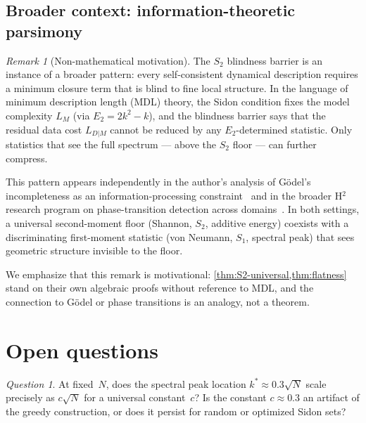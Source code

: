 \documentclass[11pt]{article}
\theoremstyle{definition}
\theoremstyle{remark}
\newtheorem{remark}[theorem]{Remark}
\newtheorem{question}[theorem]{Question}
\begin{document}
\subsection{Broader context: information-theoretic parsimony}

\begin{remark}[Non-mathematical motivation]
The $S_2$ blindness barrier is an instance of a broader
pattern: every self-consistent dynamical description
requires a minimum closure term that is blind to fine local
structure.  In the language of minimum description length
(MDL) theory, the Sidon condition fixes the model complexity
$L_M$ (via $E_2 = 2k^2 - k$), and the blindness barrier says
that the residual data cost $L_{D|M}$ cannot be reduced by
any $E_2$-determined statistic.  Only statistics that see the
full spectrum --- above the $S_2$ floor --- can further compress.

This pattern appears independently in the author's analysis of
G\"odel's incompleteness as an information-processing
constraint~\cite{Mendoza2026a} and in the broader H$^2$
research program on phase-transition detection across
domains~\cite{Mendoza2026b}.  In both settings, a universal
second-moment floor (Shannon, $S_2$, additive energy) coexists
with a discriminating first-moment statistic (von Neumann,
$S_1$, spectral peak) that sees geometric structure invisible
to the floor.

We emphasize that this remark is motivational:
\cref{thm:S2-universal,thm:flatness} stand on their own
algebraic proofs without reference to MDL, and the connection
to G\"odel or phase transitions is an analogy, not a theorem.
\end{remark}

\section{Open questions}\label{sec:open}

\begin{question}\label{q:peak-location}
At fixed~$N$, does the spectral peak location $k^* \approx 0.3\sqrt{N}$
scale precisely as $c\sqrt{N}$ for a universal constant~$c$?
Is the constant $c \approx 0.3$ an artifact of the greedy construction,
or does it persist for random or optimized Sidon sets?
\end{question}
\end{document}
